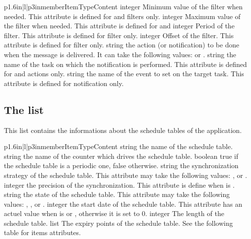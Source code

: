 \begin{longtableiii}{p{1.6in}|l|p{3in}}{member}{Item}{Type}{Content}
  {integer}
  {Minimum value of the filter when needed. This attribute is defined for {\small{}} and {\small{}} filters only.}
  {integer}
  {Maximum value of the filter when needed. This attribute is defined for {\small{}} and {\small{}}}     
  {integer}
  {Period of the filter. This attribute is defined for {\small{}} filter only.}
  {integer}
  {Offset of the filter. This attribute is defined for {\small{}} filter only.}
  {string}
  {the action (or notification) to be done when the message is delivered. It can take the following values:  or .}
  {string}
  {the name of the task on which the notification is performed. This attribute is defined for  and  actions only.}
  {string}
  {the name of the event to set on the target task. This attribute is defined for  notification only.}
\end{longtableiii}

\subsection{The  list}

This list contains the informations about the schedule tables of the application.

\begin{longtableiii}{p{1.6in}|l|p{3in}}{member}{Item}{Type}{Content}
  {string}
  {the name of the schedule table.}
  {string}
  {the name of the counter which drives the schedule table.}
  {boolean}
  {true if the schedule table is a periodic one, false otherwise.}
  {string}
  {the synchronization strategy of the schedule table. This attribute may take the following values: {\small{}, } or {\small{}}.}
  {integer}
  {the precision of the synchronization. This attribute is define when  is {\small{}}.}
  {string}
  {the state of the schedule table. This attribute may take the following values: {\small{}, , } or {\small{}}.}
  {integer}
  {the start date of the schedule table. This attribute has an actuel value when  is {\small{}} or {\small{}}, otherwise it is set to 0.}
  {integer}
  {The length of the schedule table.}
  {list}
  {The expiry points of the schedule table. See the following table for items attributes.}
\end{longtableiii}

